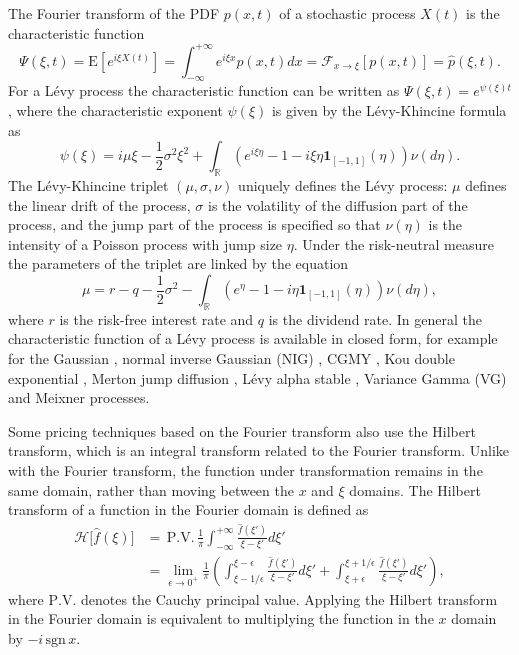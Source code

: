 \documentclass[11pt,a4paper]{article}
\begin{document}
The Fourier transform of the PDF $p(x,t)$ of a stochastic process $X(t)$ is the characteristic function
\begin{equation}
\label{eq:CharFun}
\Psi(\xi,t)=\mathrm{E}\left[e^{i\xi X(t)}\right]=\int^{+\infty}_{-\infty}e^{i\xi x}p(x,t)dx=\mathcal{F}_{x\rightarrow\xi}\left[p(x,t)\right]=\widehat{p}(\xi,t).
\end{equation}
For a L\'evy process the characteristic function can be written as $\Psi(\xi,t)=e^{\psi(\xi)t}$, where the characteristic exponent $\psi(\xi)$ is given by the L\'evy-Khincine formula as
\begin{equation}
\label{eq:CharExp}
\psi(\xi)=i\mu\xi-\frac{1}{2}\sigma^2\xi^2+\int_{\mathbb{R}}(e^{i\xi\eta}-1-i\xi\eta\mathbf{1}_{[-1,1]}(\eta))\nu(d\eta).
\end{equation}
The L\'evy-Khincine triplet $(\mu,\sigma,\nu)$ uniquely defines the L\'evy process: $\mu$ defines the linear drift of the process, $\sigma$ is the volatility of the diffusion part of the process, and the jump part of the process is specified so that $\nu(\eta)$ is the intensity of a Poisson process with jump size $\eta$. Under the risk-neutral measure the parameters of the triplet are linked by the equation
\begin{equation}
\mu = r-q-\frac{1}{2}\sigma^2-\int_\mathbb{R}(e^\eta-1-i\eta\mathbf{1}_{[-1,1]}(\eta))\nu(d\eta),
\end{equation}
where $r$ is the risk-free interest rate and $q$ is the dividend rate.
In general the characteristic function of a L\'evy process is available in closed form, for example for the Gaussian \citep{Schoutens2003}, normal inverse Gaussian (NIG) \citep{Barndorff1998}, CGMY \citep{Carr2002}, Kou double exponential \citep{kou2002jump}, Merton jump diffusion \citep{merton1976option}, L\'evy alpha stable \citep{Nolan2017}, Variance Gamma (VG) \citep{Madan1990} and Meixner \citep{Schoutens2003} processes.

Some pricing techniques based on the Fourier transform also use the Hilbert transform, which is an integral transform related to the Fourier transform. Unlike with the Fourier transform, the function under transformation remains in the same domain, rather than moving between the $x$ and $\xi$ domains. The Hilbert transform of a function in the Fourier domain is defined as
\begin{align}
\label{eq:HilbTrans}
\mathcal{H}\big[\widehat{f}(\xi)\big]&=\,\mathrm{P.V.}\,\frac{1}{\pi}\int^{+\infty}_{-\infty}\frac{\widehat{f}(\xi')}{\xi-\xi'}d\xi'\nonumber\\
&=\lim_{\epsilon\rightarrow0^+}\frac{1}{\pi}\left(\int_{\xi-1/\epsilon}^{\xi-\epsilon} \frac{\widehat{f}(\xi')}{\xi-\xi'} d\xi'+\int_{\xi+\epsilon}^{\xi+1/\epsilon} \frac{\widehat{f}(\xi')}{\xi-\xi'} d\xi'\right),
\end{align}
where $\mathrm{P.V.}$ denotes the Cauchy principal value. Applying the Hilbert transform in the Fourier domain is equivalent to multiplying the function in the $x$ domain by $-i\,\mathrm{sgn}\,x$.
\end{document}
